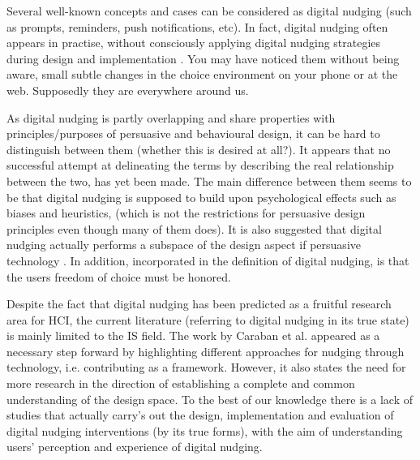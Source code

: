 Several well-known concepts and cases can be considered as digital nudging (such as prompts, reminders, push notifications, etc). In fact, digital nudging often appears in practise, without consciously applying digital nudging strategies during design and implementation \cite{schneider_digital_2018}.
You may have noticed them without being aware, small subtle changes in the choice environment on your phone or at the web. Supposedly they are everywhere around us. 

As digital nudging is partly overlapping and share properties with principles/purposes of persuasive and behavioural design, it can be hard to distinguish between them (whether this is desired at all?). It appears that no successful attempt at delineating the terms by describing the real relationship between the two, has yet been made. The main difference between them seems to be that digital nudging is supposed to build upon psychological effects such as biases and heuristics\cite{mirsch_making_2018},
(which is not the restrictions for persuasive design principles even though many of them does). It is also suggested that digital nudging actually performs a subspace of the design aspect if persuasive technology
\cite{schneider_digital_2018}. 
In addition, incorporated in the definition of digital nudging, is that the users freedom of choice must be honored. 



Despite the fact that digital nudging has been predicted as a fruitful research area for HCI\cite{mirsch_digital_2017},
the current literature (referring to digital nudging in its true state) is mainly limited to the IS field. The work by Caraban et al. appeared as a necessary step forward by highlighting different approaches for nudging through technology, i.e. contributing as a framework. However, it also states the need for more research in the direction of establishing a complete and common understanding of the design space. To the best of our knowledge there is a lack of studies that actually carry's out the design, implementation and evaluation  of digital nudging interventions (by its true forms), with the aim of understanding users' perception and experience of digital nudging.

